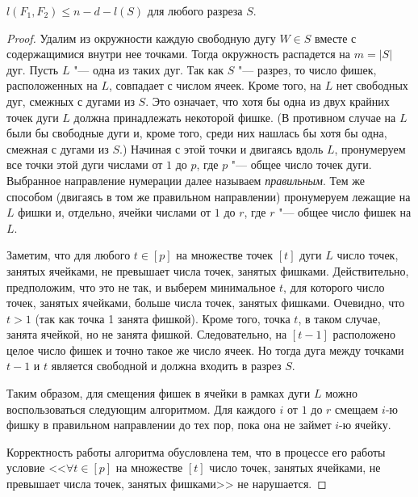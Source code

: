 %
%

\begin{lemma}
	\(l(F_1,F_2)\le n - d - l(S)\) для любого разреза $S$.
\end{lemma}

\begin{proof}
Удалим из окружности каждую свободную дугу $W \in S$ вместе с содержащимися внутри нее точками. Тогда окружность распадется на $m = |S|$ дуг. Пусть $L$ "--- одна из таких дуг. Так как $S$ "--- разрез, то число фишек, расположенных на $L$, совпадает с числом ячеек. Кроме того, на $L$ нет свободных дуг, смежных с дугами из $S$. Это означает, что хотя бы одна из двух крайних точек дуги $L$ должна принадлежать некоторой фишке.
(В противном случае на $L$ были бы свободные дуги и, кроме того, среди них нашлась бы хотя бы одна, смежная с дугами из $S$.)
Начиная с этой точки и двигаясь вдоль $L$, пронумеруем все точки этой дуги числами от $1$ до $p$, где $p$ "--- общее число точек дуги. Выбранное направление нумерации далее называем \emph{правильным}.
Тем же способом (двигаясь в том же правильном направлении) пронумеруем лежащие на $L$ фишки и, отдельно, ячейки числами от $1$ до $r$, где $r$ "--- общее число фишек на $L$.

Заметим, что для любого $t \in [p]$ на множестве точек $[t]$ дуги $L$ число точек, занятых ячейками, не превышает числа точек, занятых фишками. Действительно, предположим, что это не так, и выберем минимальное $t$, для которого число точек, занятых ячейками, больше числа точек, занятых фишками. Очевидно, что $t > 1$ (так как точка 1 занята фишкой). Кроме того, точка $t$, в таком случае, занята ячейкой, но не занята фишкой. Следовательно, на $[t-1]$ расположено целое число фишек и точно такое же число ячеек. Но тогда дуга между точками $t-1$ и $t$ является свободной и должна входить в разрез $S$.

Таким образом, для смещения фишек в ячейки в рамках дуги $L$ можно воспользоваться следующим алгоритмом.
Для каждого $i$ от $1$ до $r$ смещаем $i$-ю фишку в правильном направлении до тех пор, пока она не займет $i$-ю ячейку.

Корректность работы алгоритма обусловлена тем, что в процессе его работы условие <<$\forall t \in [p]$ на множестве $[t]$ число точек, занятых ячейками, не превышает числа точек, занятых фишками>> не нарушается.


\end{proof}
